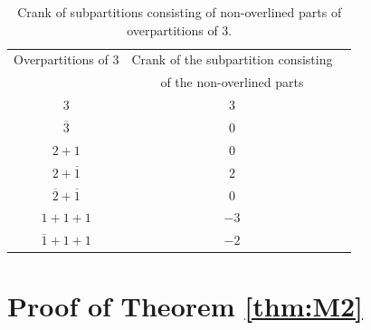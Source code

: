 \documentclass[pdftex]{sigma}
\numberwithin{equation}{section}
\newcommand\thm[1]{\ref{thm:#1}}
\begin{document}
\begin{table}[t]\centering
\caption{Crank of subpartitions consisting of non-overlined parts of overpartitions of $3$.}\label{t2}
\vspace{2mm}
\begin{tabular}{ c c c }
Overpartitions of $3$ & Crank of the subpartition consisting \\ &of the non-overlined parts \\
 $3$                         & $3$ \\
 $\overline{3}$              & $0$ \\
 $2+1$                       & $0$ \\
 $2+\overline{1}$            & $2$ \\
 $\overline{2}+\overline{1}$ & $0$ \\
 $1+1+1$                     & \hspace{-3mm}$-3$ \\
 $\overline{1}+1+1$          & \hspace{-3mm}$-2$
\end{tabular}
\end{table}

\section{Proof of Theorem \thm{M2}}\label{section3}
\end{document}
